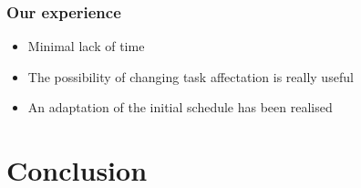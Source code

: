 \documentclass[xcolor=table]{beamer}
\begin{document}
\begin{frame} \frametitle{Our experience}
\begin{itemize}
\item Minimal lack of time
\item The possibility of changing task affectation is really useful
\item An adaptation of the initial schedule has been realised
\end{itemize}

\end{frame}



\section{Conclusion}
\end{document}
